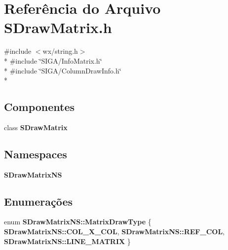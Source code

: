 \section{Referência do Arquivo S\+Draw\+Matrix.\+h}
\label{_s_draw_matrix_8h}
{\ttfamily \#include $<$wx/string.\+h$>$}\\*
{\ttfamily \#include \char`\"{}S\+I\+G\+A/\+Info\+Matrix.\+h\char`\"{}}\\*
{\ttfamily \#include \char`\"{}S\+I\+G\+A/\+Column\+Draw\+Info.\+h\char`\"{}}\\*
\subsection*{Componentes}
\begin{DoxyCompactItemize}
\item 
class {\bf S\+Draw\+Matrix}
\end{DoxyCompactItemize}
\subsection*{Namespaces}
\begin{DoxyCompactItemize}
\item 
 {\bf S\+Draw\+Matrix\+NS}
\end{DoxyCompactItemize}
\subsection*{Enumerações}
\begin{DoxyCompactItemize}
\item 
enum {\bf S\+Draw\+Matrix\+N\+S\+::\+Matrix\+Draw\+Type} \{ {\bf S\+Draw\+Matrix\+N\+S\+::\+C\+O\+L\+\_\+\+X\+\_\+\+C\+OL}, 
{\bf S\+Draw\+Matrix\+N\+S\+::\+R\+E\+F\+\_\+\+C\+OL}, 
{\bf S\+Draw\+Matrix\+N\+S\+::\+L\+I\+N\+E\+\_\+\+M\+A\+T\+R\+IX}
 \}
\end{DoxyCompactItemize}
